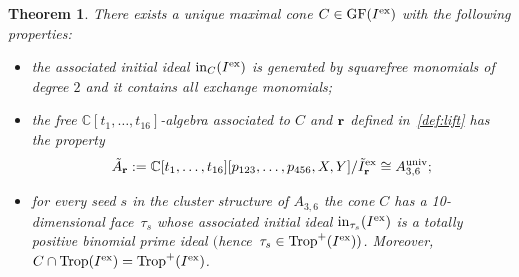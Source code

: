 \documentclass[10pt,a4paper]{amsart}
\newcommand{\thlabel}[1]{\label{#1}}
\newcommand{\thref}[1]{\ref{#1}}
\newtheorem{Theorem}{Theorem}[section]
\numberwithin{equation}{section}
\DeclareMathOperator{\init}{in}
\DeclareMathOperator{\GF}{GF}
\DeclareMathOperator{\trop}{Trop}
\begin{document}
\begin{Theorem}\thlabel{thm:Gr36}
There exists a unique maximal cone $C\in\GF(I^{\rm ex})$ with the following properties:
\begin{itemize}\itemsep=0pt
 \item[$(i)$] the associated initial ideal $\init_C(I^{\rm ex})$ is generated by squarefree monomials of degree $2$ and it contains all exchange monomials;
\item[$(ii)$] the free $\mathbb C[t_1,\dots,t_{16}]$-algebra associated to $C$ and $\bf r$ defined in~\thref{def:lift} has the pro\-perty
 \[
 \tilde A_{\bf r}:=\mathbb C[t_1,\dots,t_{16}][p_{123}, \dots , p_{456}, X,Y]/\tilde I^{\rm ex}_{\bf r} \cong A_{3,6}^{\rm univ};
 \]
\item[$(iii)$] for every seed $s$ in the cluster structure of $A_{3,6}$ the cone $C$ has a 10-dimensional face~$\tau_s$ whose associated initial ideal $\init_{\tau_s}(I^{\rm ex})$ is a totally positive binomial prime ideal $($hence~$\tau_s\in \trop^+(I^{\rm ex}))$.
 Moreover, $C\cap \trop(I^{\rm ex})=\trop^+(I^{\rm ex})$.
\end{itemize}
\end{Theorem}
\end{document}
